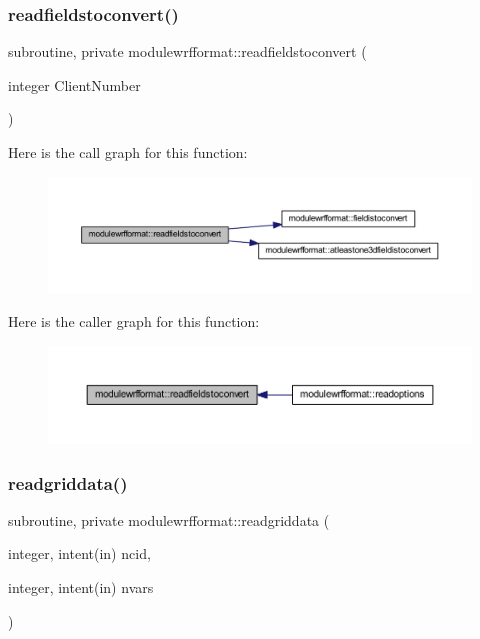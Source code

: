\subsubsection{\texorpdfstring{readfieldstoconvert()}{readfieldstoconvert()}}
{\footnotesize\ttfamily subroutine, private modulewrfformat\+::readfieldstoconvert (\begin{DoxyParamCaption}\item[{integer}]{Client\+Number }\end{DoxyParamCaption})\hspace{0.3cm}{\ttfamily [private]}}

Here is the call graph for this function\+:\nopagebreak
\begin{figure}[H]
\begin{center}
\leavevmode
\includegraphics[width=350pt]{namespacemodulewrfformat_a6acfc9c1ce2d45f5a0a6187e1e8083f8_cgraph}
\end{center}
\end{figure}
Here is the caller graph for this function\+:\nopagebreak
\begin{figure}[H]
\begin{center}
\leavevmode
\includegraphics[width=350pt]{namespacemodulewrfformat_a6acfc9c1ce2d45f5a0a6187e1e8083f8_icgraph}
\end{center}
\end{figure}
\mbox{\label{namespacemodulewrfformat_a0a9c15502f5f361afd382196884a739d}} 
\subsubsection{\texorpdfstring{readgriddata()}{readgriddata()}}
{\footnotesize\ttfamily subroutine, private modulewrfformat\+::readgriddata (\begin{DoxyParamCaption}\item[{integer, intent(in)}]{ncid,  }\item[{integer, intent(in)}]{nvars }\end{DoxyParamCaption})\hspace{0.3cm}{\ttfamily [private]}}

